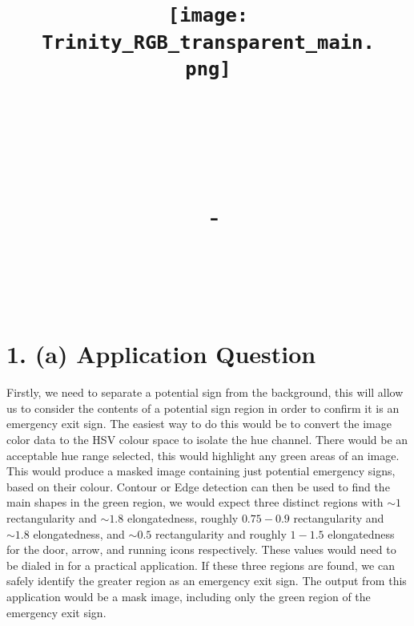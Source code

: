 \documentclass[a4paper,12pt]{article}
\title{
    \vspace{-1in}
    \begin{figure}[!ht]
    \flushleft
    \texttt{[image: Trinity\_RGB\_transparent\_main.png]}
    \end{figure}
    \vspace{-0.5cm}
    \hrulefill \\
    \vspace{1cm}
    \textmd{\textbf{\moduleCode\ \moduleName}}\\
    \textmd{\textbf{\assignmentTitle}}\\
    {
        \large
        \textmd{\authorName\ - \authorID}\\
        \textmd{\reportDate}\\
    }
    \vspace{0.5cm}
    \hrulefill \\
}
\date{}
\author{}
\begin{document}
\section{1. (a) Application Question}
Firstly, we need to separate a potential sign from the background, this will allow us to consider the contents of a potential sign region in order to confirm it is an emergency exit sign. The easiest way to do this would be to convert the image color data to the HSV colour space to isolate the hue channel. There would be an acceptable hue range selected, this would highlight any green areas of an image. This would produce a masked image containing just potential emergency signs, based on their colour. Contour or Edge detection can then be used to find the main shapes in the green region, we would expect three distinct regions with $\sim 1$ rectangularity and $\sim 1.8$ elongatedness, roughly $0.75-0.9$ rectangularity and $\sim 1.8$ elongatedness, and $\sim 0.5$ rectangularity and roughly $1-1.5$ elongatedness for the door, arrow, and running icons respectively. These values would need to be dialed in for a practical application. If these three regions are found, we can safely identify the greater region as an emergency exit sign. The output from this application would be a mask image, including only the green region of the emergency exit sign.
\end{document}
